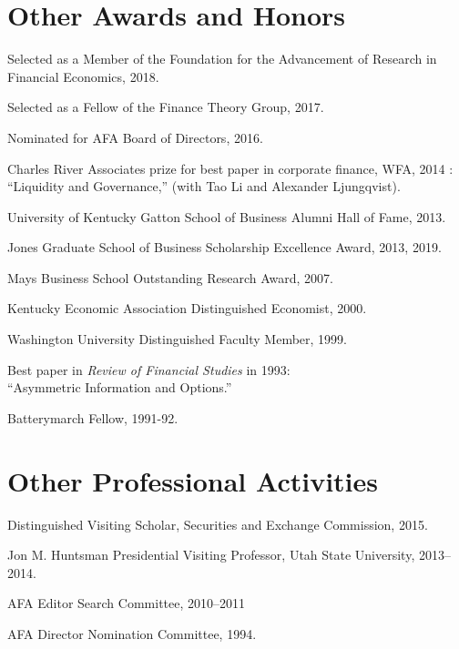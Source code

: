 \documentclass[margin, 11pt]{res}
\newenvironment{list1}{
  \begin{list}{}{%
            \setlength{\itemsep}{0in}
      \setlength{\parsep}{0in} \setlength{\parskip}{0in}
      \setlength{\topsep}{0in} \setlength{\partopsep}{0in}
      \setlength{\leftmargin}{0.2in}}}{\end{list}}
\begin{document}
\begin{resume}
\section{\sc Other Awards and Honors}
\begin{list1}
  \item Selected as a Member of the Foundation for the Advancement of Research in \\ \hspace*{0.5cm} Financial Economics, 2018.
\item Selected as a Fellow of the Finance Theory Group, 2017.
\item Nominated for AFA Board of Directors, 2016.
\item Charles River Associates prize for best paper in corporate finance, WFA, 2014 :\\
\hspace*{0.5cm}``Liquidity and Governance,'' (with Tao Li and Alexander Ljungqvist).
\item University of Kentucky Gatton School of Business Alumni Hall of Fame, 2013.
\item Jones Graduate School of Business Scholarship Excellence Award, 2013, 2019.
\item Mays Business School Outstanding Research Award, 2007.
\item Kentucky Economic Association Distinguished Economist, 2000.
\item Washington University Distinguished Faculty Member, 1999.
\item Best paper in \textit{Review of Financial Studies} in 1993:\\
\hspace*{0.5cm} ``Asymmetric Information and Options.''
\item Batterymarch Fellow, 1991-92.
\end{list1}

\section{\sc Other Professional Activities}
\begin{list1}
\item Distinguished Visiting Scholar, Securities and Exchange Commission, 2015.
\item Jon M. Huntsman Presidential Visiting Professor, Utah State University, 2013--2014.
\item AFA Editor Search Committee, 2010--2011
\item AFA Director Nomination Committee, 1994.


\end{list1}



\end{resume}
\end{document}
